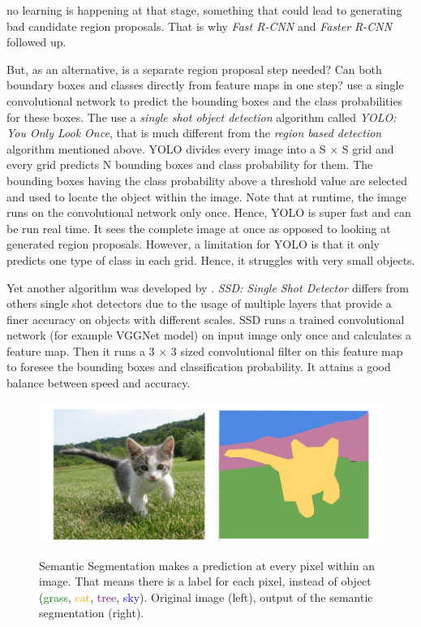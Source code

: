 \documentclass[12pt,a4paper]{report}
\newcommand{\term}{\textit}
\newcommand{\acronym}{\MakeUppercase}
\begin{document}
	no learning is happening at that stage, something that could lead to generating bad 
	candidate region proposals. That is why \term{Fast \acronym{r-cnn}} and 
	\term{Faster \acronym{r-cnn}} followed up.
	\par
	But, as an alternative, is a separate region proposal step needed? Can both boundary 
	boxes and classes directly from feature maps in one step? \citet{Redmon} use a single 
	convolutional network to predict the bounding boxes and the class probabilities for 
	these boxes. The use a \term{single shot object detection} algorithm called 
	\term{\acronym{yolo}: You Only Look Once}, that is much different from the 
	\term{region based detection} algorithm mentioned above. \acronym{yolo} divides every 
	image into a S $\times$ S grid and every grid predicts N bounding boxes and class 
	probability for them. The bounding boxes having the class probability above a threshold 
	value are selected and used to locate the object within the image. Note that at runtime, 
	the image runs on the convolutional network only once. Hence, \acronym{yolo} is super 
	fast and can be run real time. It sees the complete image at once as opposed to looking 
	at generated region proposals. However, a limitation for \acronym{yolo} is that it only 
	predicts one type of class in each grid. Hence, it struggles with very small objects.
	\par
	Yet another algorithm was developed by \citet{Liu}. \term{\acronym{ssd}: Single Shot 
	Detector} differs from others single shot detectors due to the usage of multiple layers 
	that provide a finer accuracy on objects with different scales. \acronym{ssd} runs a 
	trained convolutional network (for example VGGNet model) on input image only once and 
	calculates a feature map. Then it runs a 3 $\times$ 3 sized convolutional filter on 
	this feature map to foresee the bounding boxes and classification probability. It 
	attains a good balance between speed and accuracy.
	\\
	
	\begin{figure}[h!]
		\caption{Semantic Segmentation makes a prediction at every pixel within an image. 
		That means there is a label for each pixel, instead of object (\textcolor{green}{grass}, \textcolor{orange}{cat}, \textcolor{purple}{tree}, \textcolor{blue}{sky}). Original 
		image (left), output of the semantic segmentation (right).}
		\centering
		\includegraphics[width=\textwidth]{segm}
		\label{fig:segm}
	\end{figure}
	
\end{document}
